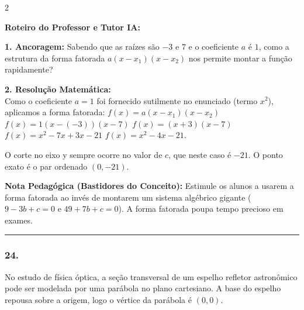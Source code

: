 \begin{multicols*}{2}
\ifgabarito
    \begin{tcolorbox}[colback=CorTitUm!5, colframe=CorTitUm, boxrule=1pt, arc=4pt, left=6pt, right=6pt, top=6pt, bottom=6pt]
    \small\textbf{\textcolor{CorTitUm}{Roteiro do Professor e Tutor IA:}}\par\vspace{0.1cm}
    \color{CinzaEscuro}
    \textbf{1. Ancoragem:} Sabendo que as raízes são $-3$ e $7$ e o coeficiente $a$ é $1$, como a estrutura da forma fatorada $a(x - x_1)(x - x_2)$ nos permite montar a função rapidamente?\par\vspace{0.1cm}
    \textbf{2. Resolução Matemática:}\\
    Como o coeficiente $a=1$ foi fornecido sutilmente no enunciado (termo $x^2$), aplicamos a forma fatorada:
    $f(x) = a(x - x_1)(x - x_2)$
    $f(x) = 1(x - (-3))(x - 7)$
    $f(x) = (x + 3)(x - 7)$
    $f(x) = x^2 - 7x + 3x - 21$
    $f(x) = x^2 - 4x - 21$.
    
    O corte no eixo y sempre ocorre no valor de $c$, que neste caso é $-21$.
    O ponto exato é o par ordenado $(0, -21)$.
    \end{tcolorbox}
    \vspace{0.15cm}
    
    \begin{boxexplicacao}
    \textbf{Nota Pedagógica (Bastidores do Conceito):} Estimule os alunos a usarem a forma fatorada ao invés de montarem um sistema algébrico gigante ($9 - 3b + c = 0$ e $49 + 7b + c = 0$). A forma fatorada poupa tempo precioso em exames.
    \end{boxexplicacao}
\fi

\par\vspace{\espacoQuestao}

\noindent\textcolor{CorLinha}{\rule{\linewidth}{0.5pt}} 
\par\vspace{\espacoPreQuestao}
\subsubsection*{24.} 
\begin{enunciadoLiteral}
No estudo de física óptica, a seção transversal de um espelho refletor astronômico pode ser modelada por uma parábola no plano cartesiano. A base do espelho repousa sobre a origem, logo o vértice da parábola é $(0,0)$.


\end{enunciadoLiteral}
\end{multicols*}
